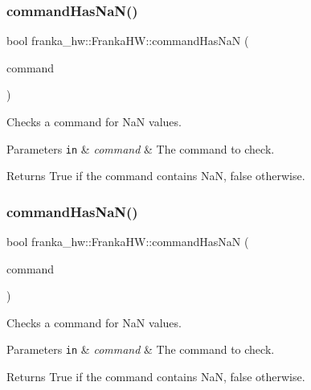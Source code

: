 \subsubsection{\texorpdfstring{command\+Has\+Na\+N()}{commandHasNaN()}\hspace{0.1cm}{\footnotesize\ttfamily [2/5]}}
{\footnotesize\ttfamily bool franka\+\_\+hw\+::\+Franka\+H\+W\+::command\+Has\+NaN (\begin{DoxyParamCaption}\item[{const franka\+::\+Joint\+Positions \&}]{command }\end{DoxyParamCaption})\hspace{0.3cm}{\ttfamily [static]}}

Checks a command for NaN values.


\begin{DoxyParams}[1]{Parameters}
\mbox{\tt in}  & {\em command} & The command to check.\\
\hline
\end{DoxyParams}
\begin{DoxyReturn}{Returns}
True if the command contains NaN, false otherwise. 
\end{DoxyReturn}
\mbox{\label{classfranka__hw_1_1_franka_h_w_a56bc8a84589c605327e9bbcb64809fe1}} 
\subsubsection{\texorpdfstring{command\+Has\+Na\+N()}{commandHasNaN()}\hspace{0.1cm}{\footnotesize\ttfamily [3/5]}}
{\footnotesize\ttfamily bool franka\+\_\+hw\+::\+Franka\+H\+W\+::command\+Has\+NaN (\begin{DoxyParamCaption}\item[{const franka\+::\+Joint\+Velocities \&}]{command }\end{DoxyParamCaption})\hspace{0.3cm}{\ttfamily [static]}}

Checks a command for NaN values.


\begin{DoxyParams}[1]{Parameters}
\mbox{\tt in}  & {\em command} & The command to check.\\
\hline
\end{DoxyParams}
\begin{DoxyReturn}{Returns}
True if the command contains NaN, false otherwise. 
\end{DoxyReturn}
\mbox{\label{classfranka__hw_1_1_franka_h_w_aeec15cdb4cd9edb0976e96c63b62f93c}} 

